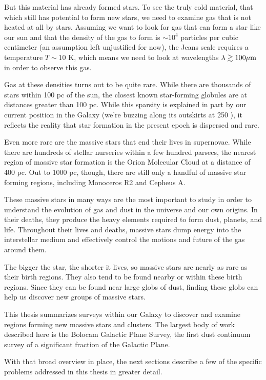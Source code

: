 But this material has already formed stars.  To see the truly cold material, that
which still has potential to form new stars, we need to examine gas that is not
heated at all by stars.  Assuming we want to look for gas that can form a star
like our sun and that the density of the gas to form is $\sim10^4$ \hh particles
per cubic centimeter (an assumption left unjustified for now), the Jeans scale
requires a temperature $T\sim10$ K, which means we need to look at wavelengths
$\lambda \gtrsim 100 \mu \textrm{m}$ in order to observe this gas.

Gas at these densities turns out to be quite rare.  While there are thousands
of stars within 100 pc of the sun, the closest known star-forming globules are
at distances greater than 100 pc.  While this sparsity is explained in part by
our current position in the Galaxy (we're buzzing along its outskirts at 250
\kms), it reflects the reality that star formation in the present epoch is
dispersed and rare.

Even more rare are the massive stars that end their lives in supernovae.  While there
are hundreds of stellar nurseries within a few hundred parsecs, the nearest
region of massive star formation is the Orion Molecular Cloud at a distance of
400 pc.  Out to 1000 pc, though, there are still only a handful of massive star
forming regions, including Monoceros R2 and Cepheus A.

These massive stars in many ways are the most important to study in order to
understand the evolution of gas and dust in the universe and our own origins.
In their deaths, they produce the heavy elements required to form dust,
planets, and life.  Throughout their lives and deaths, massive stars dump
energy into the interstellar medium and effectively control the motions and
future of the gas around them.

The bigger the star, the shorter it lives, so massive stars are nearly as rare
as their birth regions.  They also tend to be found nearby or within these
birth regions.  Since they can be found near large globs of dust, finding these
globs can help us discover new groups of massive stars.

This thesis summarizes surveys within our Galaxy to discover and examine
regions forming new massive stars and clusters.  The largest body of work
described here is the Bolocam Galactic Plane Survey, the first dust continuum
survey of a significant fraction of the Galactic Plane.

With that broad overview in place, the next sections describe a few of the
specific problems addressed in this thesis in greater detail.

